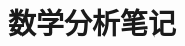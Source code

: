\documentclass{../mathnotes-rep}
\begin{document}
\title{数学分析笔记}

\maketitle
\tableofcontents





\end{document}

